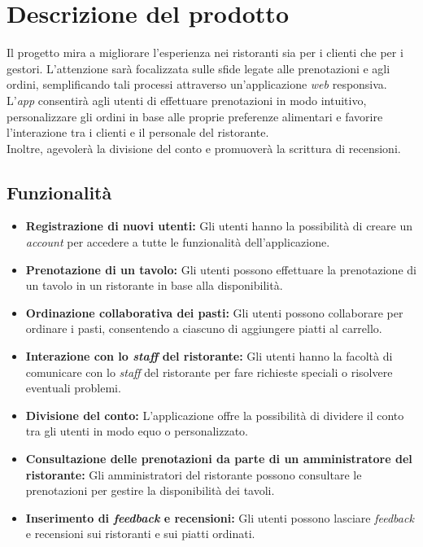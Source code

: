 \section{Descrizione del prodotto}
Il progetto mira a migliorare l'esperienza nei ristoranti sia per i clienti che per i gestori.
L'attenzione sarà focalizzata sulle sfide legate alle prenotazioni e agli ordini, semplificando tali
processi attraverso un'applicazione \textit{web} responsiva.
L'\textit{app} consentirà agli utenti di effettuare prenotazioni in modo intuitivo, personalizzare
gli ordini in base alle proprie preferenze alimentari e favorire l'interazione tra i clienti e
il personale del ristorante. \\
Inoltre, agevolerà la divisione del conto e promuoverà la scrittura di recensioni.


\subsection{Funzionalità}

\begin{itemize}
	\item \textbf{Registrazione di nuovi utenti:} Gli utenti hanno la possibilità di creare un \textit{account} per accedere a tutte le funzionalità dell'applicazione.
	\item \textbf{Prenotazione di un tavolo:} Gli utenti possono effettuare la prenotazione di un tavolo in un ristorante in base alla disponibilità.
	\item \textbf{Ordinazione collaborativa dei pasti:} Gli utenti possono collaborare per ordinare i pasti, consentendo a ciascuno di aggiungere piatti al carrello.
	\item \textbf{Interazione con lo \textit{staff} del ristorante:} Gli utenti hanno la facoltà di comunicare con lo \textit{staff} del ristorante per fare richieste speciali o risolvere eventuali problemi.
	\item \textbf{Divisione del conto:} L'applicazione offre la possibilità di dividere il conto tra gli utenti in modo equo o personalizzato.
	\item \textbf{Consultazione delle prenotazioni da parte di un amministratore del ristorante:} Gli amministratori del ristorante possono consultare le prenotazioni per gestire la disponibilità dei tavoli.
	\item \textbf{Inserimento di \textit{feedback} e recensioni:} Gli utenti possono lasciare \textit{feedback} e recensioni sui ristoranti e sui piatti ordinati.
\end{itemize}
